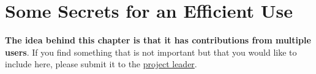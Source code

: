 
\renewcommand{\subsubsection} {\textsl{ }\\ }

\hypertarget{secrets}{}
\chapter{Some Secrets for an Efficient Use}

\textbf{The idea behind this chapter is that it has contributions from multiple users}.
If you find something that is not important but that you would like to include here,
please submit it to the \href{mailto:joseclaudio.faria@gmail.com}{project leader}.

\newpage

\newpage

\newpage

\newpage

\newpage

\newpage

\newpage

\newpage

\newpage

\newpage

\newpage

